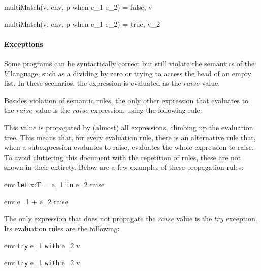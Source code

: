 \documentclass{article}
\begin{document}
  {multiMatch(v, \mbox{env}, p \; \mbox{when} \; e_1 \rightarrow e_2) = false, v}

  {multiMatch(v, \mbox{env}, p \; \mbox{when} \; e_1 \rightarrow e_2) = true, v_2}

\paragraph{Exceptions}

Some programs can be syntactically correct but still violate the semantics of the $V$ language, such as a dividing by zero or trying to access the head of an empty list.
In these scenarios, the expression is evaluated as the $raise$ value.

Besides violation of semantic rules, the only other expression that evaluates to the $raise$ value is the $raise$ expression, using the following rule:


This value is propagated by (almost) all expressions, climbing up the evaluation tree.
This means that, for every evaluation rule, there is an alternative rule that, when a subexpression evaluates to raise, evaluates the whole expression to raise.
To avoid cluttering this document with the repetition of rules, these are not shown in their entirety.
Below are a few examples of these propagation rules:

    {\mbox{env} \vdash \texttt{let} \; x:T = e_1 \; \texttt{in} \; e_2 \Downarrow raise}

    {\mbox{env} \vdash e_1 + e_2 \Downarrow raise}

The only expression that does not propagate the $raise$ value is the $try$ exception.
Its evaluation rules are the following:

    {\mbox{env} \vdash \texttt{try} \; e_1 \; \texttt{with} \; e_2 \Downarrow v}

    {\mbox{env} \vdash \texttt{try} \; e_1 \; \texttt{with} \; e_2 \Downarrow v}
\end{document}
